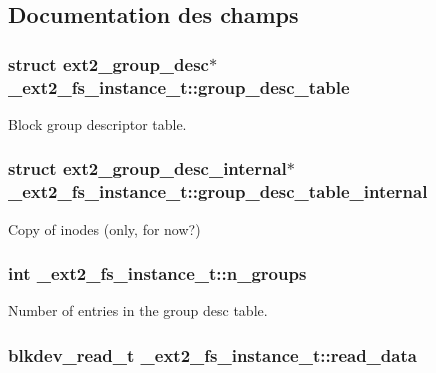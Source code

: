 \subsection{Documentation des champs}
\hypertarget{struct__ext2__fs__instance__t_acc01ef58cbc6cfa9d3ff4e08709a561a}{
\subsubsection[{group\-\_\-desc\-\_\-table}]{\setlength{\rightskip}{0pt plus 5cm}struct {\bf ext2\-\_\-group\-\_\-desc}$\ast$ \-\_\-ext2\-\_\-fs\-\_\-instance\-\_\-t\-::group\-\_\-desc\-\_\-table}}\label{struct__ext2__fs__instance__t_acc01ef58cbc6cfa9d3ff4e08709a561a}
Block group descriptor table. \hypertarget{struct__ext2__fs__instance__t_a9db69a1265be4c818005d18add117790}{
\subsubsection[{group\-\_\-desc\-\_\-table\-\_\-internal}]{\setlength{\rightskip}{0pt plus 5cm}struct {\bf ext2\-\_\-group\-\_\-desc\-\_\-internal}$\ast$ \-\_\-ext2\-\_\-fs\-\_\-instance\-\_\-t\-::group\-\_\-desc\-\_\-table\-\_\-internal}}\label{struct__ext2__fs__instance__t_a9db69a1265be4c818005d18add117790}
Copy of inodes (only, for now?) \hypertarget{struct__ext2__fs__instance__t_a81a5e5b8f7d46d744c96a4f28317e59f}{
\subsubsection[{n\-\_\-groups}]{\setlength{\rightskip}{0pt plus 5cm}int \-\_\-ext2\-\_\-fs\-\_\-instance\-\_\-t\-::n\-\_\-groups}}\label{struct__ext2__fs__instance__t_a81a5e5b8f7d46d744c96a4f28317e59f}
Number of entries in the group desc table. \hypertarget{struct__ext2__fs__instance__t_ac3ea85962b66914cb42ec884d70a853d}{
\subsubsection[{read\-\_\-data}]{\setlength{\rightskip}{0pt plus 5cm}blkdev\-\_\-read\-\_\-t \-\_\-ext2\-\_\-fs\-\_\-instance\-\_\-t\-::read\-\_\-data}}\label{struct__ext2__fs__instance__t_ac3ea85962b66914cb42ec884d70a853d}
